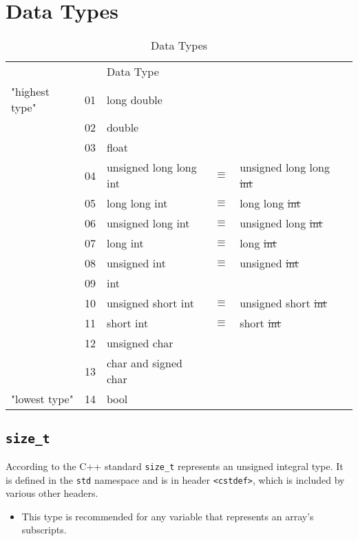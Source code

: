 \section{Data Types}
\label{sec:Data-Types}

\begin{table}[!h]
\centering
\begin{tabular}{llllll}
               &    & Data Type            &          &                    &   \\
"highest type" & 01 & long double          &          &                    &   \\
               & 02 & double               &          &                    &   \\
               & 03 & float                &          &                    &   \\
               & 04 & unsigned long long int   & $\equiv$ & unsigned long long \st{int}&   \\
               & 05 & long long int        & $\equiv$ & long long \st{int} &   \\
               & 06 & unsigned long int    & $\equiv$ & unsigned long \st{int} &   \\
               & 07 & long int             & $\equiv$ & long \st{int}      &   \\
               & 08 & unsigned int         & $\equiv$ & unsigned \st{int}  &   \\
               & 09 & int                  &          &                    &   \\
               & 10 & unsigned short int   & $\equiv$ & unsigned short \st{int} &   \\
               & 11 & short int            & $\equiv$ & short \st{int}     &   \\
               & 12 & unsigned char        &          &                    &   \\
               & 13 & char and signed char &          &                    &   \\
"lowest type"  & 14 & bool                 &          &                    &  
\end{tabular}
\caption{Data Types}
\label{tab:t_00_Data-types_Cpp}
\end{table}

\subsection{\texttt{size\_t}}
According to the C++ standard \texttt{size\_t} represents an unsigned integral type. It is defined in the \texttt{std} namespace and is in header \texttt{<cstdef>}, which is included by various other headers.

\begin{itemize}
    \item This type is recommended for any variable that represents an array's subscripts.
\end{itemize}